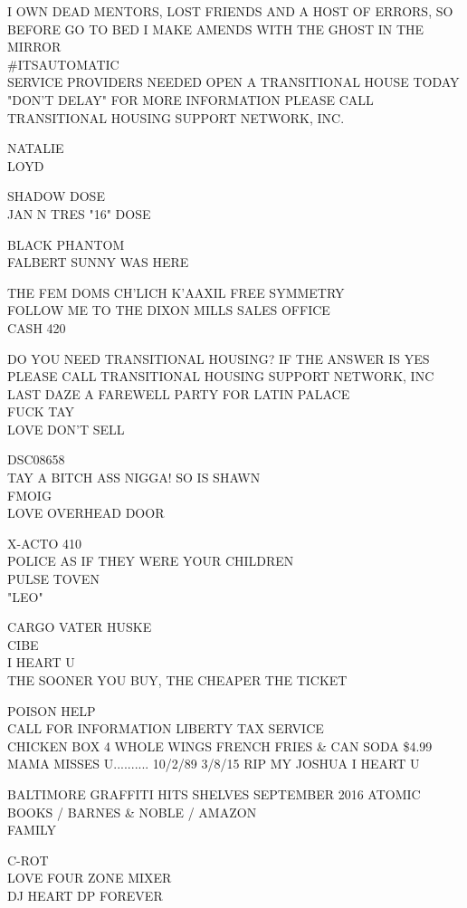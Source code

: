 \documentclass[10pt,letterpaper]{article}
\begin{document}
I OWN DEAD MENTORS, LOST FRIENDS AND A HOST OF ERRORS, SO BEFORE GO TO BED I MAKE AMENDS WITH THE GHOST IN THE MIRROR\\
\#ITSAUTOMATIC\\
SERVICE PROVIDERS NEEDED OPEN A TRANSITIONAL HOUSE TODAY "DON'T DELAY" FOR MORE INFORMATION PLEASE CALL TRANSITIONAL HOUSING SUPPORT NETWORK, INC.

NATALIE\\
LOYD

SHADOW DOSE\\
JAN N TRES "16" DOSE

BLACK PHANTOM\\
FALBERT SUNNY WAS HERE

THE FEM DOMS CH'LICH K'AAXIL FREE SYMMETRY\\
FOLLOW ME TO THE DIXON MILLS SALES OFFICE\\
CASH 420

DO YOU NEED TRANSITIONAL HOUSING?  IF THE ANSWER IS YES PLEASE CALL TRANSITIONAL HOUSING SUPPORT NETWORK, INC\\
LAST DAZE A FAREWELL PARTY FOR LATIN PALACE\\
FUCK TAY\\
LOVE DON'T SELL

DSC08658\\
TAY A BITCH ASS NIGGA!  SO IS SHAWN\\
FMOIG\\
LOVE OVERHEAD DOOR

X{-}ACTO 410\\
POLICE AS IF THEY WERE YOUR CHILDREN\\
PULSE TOVEN\\
"LEO"

CARGO VATER HUSKE\\
CIBE\\
I HEART U\\
THE SOONER YOU BUY, THE CHEAPER THE TICKET

POISON HELP\\
CALL FOR INFORMATION LIBERTY TAX SERVICE\\
CHICKEN BOX 4 WHOLE WINGS FRENCH FRIES \& CAN SODA \$4.99\\
MAMA MISSES U.......... 10/2/89 3/8/15 RIP MY JOSHUA I HEART U

BALTIMORE GRAFFITI HITS SHELVES SEPTEMBER 2016 ATOMIC BOOKS / BARNES \& NOBLE / AMAZON\\
FAMILY

C{-}ROT\\
LOVE FOUR ZONE MIXER\\
DJ HEART DP FOREVER
\end{document}
